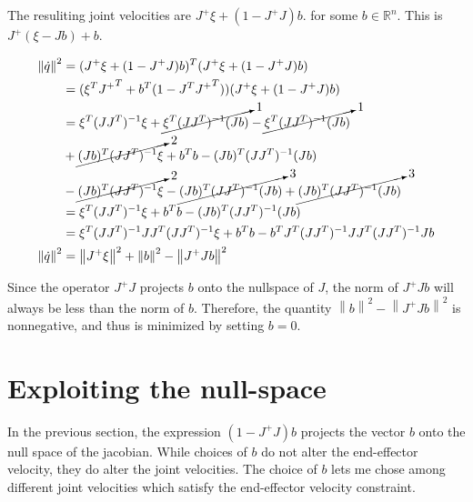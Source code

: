 \documentclass{article}
\begin{document}
The resuliting joint velocities are $J^+ \xi + (1 - J^+ J)b$.
	for some $b \in \mathbb{R}^n$.
This is $J^+ (\xi - J b) + b$.

\begin{align*}
\left\lVert \dot{q} \right\rVert^2
	& = (J^+ \xi + (1 - J^+ J) b)^T (J^+ \xi + (1 - J^+ J) b) \\
	& = (\xi^T {J^+}^T
		+ b^T (1 - J^T {J^+}^T))(J^+ \xi + (1 - J^+ J) b) \\
	& = \xi^T (J J^T)^{-1} \xi + \cancelto1{\xi^T (J J^T)^{-1} (J b)}
		- \cancelto1{\xi^T (J J^T)^{-1} (J b)}\\
	& + \cancelto2{(J b)^T (J J^T)^{-1} \xi} + b^T b 
		- (J b)^T (J J^T)^{-1} (J b)\\
	& - \cancelto2{(J b)^T (J J^T)^{-1} \xi} 
		- \cancelto3{(J b)^T (J J^T)^{-1} (J b)}
		+ \cancelto3{(J b)^T (J J^T)^{-1} (J b)}\\ 
	& = \xi^T (J J^T)^{-1} \xi + b^T b - (J b)^T (J J^T)^{-1} (J b)\\
	& = \xi^T (J J^T)^{-1} J J^T (J J^T)^{-1} \xi
	+ b^T b - b^T J^T (J J^T)^{-1}  J J^T (J J^T)^{-1} J b\\
\left\lVert \dot{q} \right\rVert^2
	& = \left\lVert J^+ \xi \right\rVert^2
		+ \left\lVert b \right\rVert^2
		- \left\lVert J^+ J b \right\rVert^2
\end{align*}

Since the operator $J^+ J$ projects $b$ onto the nullspace of $J$,
	the norm of $J^+ J b$ will always be less than the norm of $b$.
Therefore, the quantity $\left\lVert b \right\rVert^2 
	- \left\lVert J^+ J b \right\rVert^2$
	is nonnegative, and thus is minimized by setting $b = 0$.

%	
%	
%	

\section{Exploiting the null-space}

In the previous section, the expression $(1 - J^+ J) b$ projects the vector $b$ 
	onto the null space of the jacobian.
While choices of $b$ do not alter the end-effector velocity, they do alter the joint
	velocities.
The choice of $b$ lets me chose among different joint velocities which satisfy
	the end-effector velocity constraint.
\end{document}
